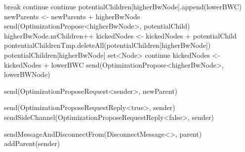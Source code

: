 \begin{algorithm}
\begin{algorithmic}[1]
                    \State break
                \EndIf
                    \State continue
                \EndIf
                    \State continue
                \EndIf
                    \State potentialChildren[higherBwNode].append(lowerBWC)
                            \State newParents <- newParents + higherBwNode
                            \State send(OptimizationPropose<higherBwNode>, potentialChild)
                            \State higherBwNode.nrChildren++
                            \State kickedNodes <- kickedNodes + potentialChild
                        \EndFor
                            \State pontentialChildrenTmp.deleteAll(potentialChildren[higherBwNode])
                        \EndFor
                        \State potentialChildren[higherBwNode] \asdassign set<Node>
                        \State continue
                    \EndIf
                \EndIf
                \State kickedNodes <- kickedNodes + lowerBWC
                \State send(OptimizationPropose<higherBwNode>, lowerBWNode)
            \EndFor
        \asdend

                \State send(OptimizationProposeRequest<sender>, newParent)
            \EndIf
        \asdend

             
                \State send(OptimizationProposeRequestReply<true>, sender)
            \Else
                \State sendSideChannel(OptimizationProposeRequestReply<false>, sender)
            \EndIf
        \asdend

                \State sendMessageAndDisconnectFrom(DisconnectMessage<>, parent)
                \State addParent(sender)
            \EndIf
        \asdend

    \end{algorithmic}
\end{algorithm}